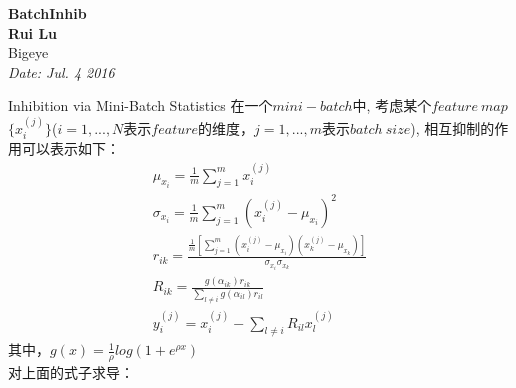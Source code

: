 \documentclass[oneside]{article}
\newcommand{\lecture}[5]{
   \newpage
   \noindent
   \begin{center}
        {\LARGE \bf #1} \\
        \vspace{0.5cm}
        {\bf #2} \\
        \vspace{0cm}
        #3\\
        \vspace{0.3cm}
        \it Date: #4
   \end{center}
}
\begin{document}
\graphicspath{{figures/}}
\lecture{BatchInhib}{Rui Lu}{Bigeye}{Jul. 4 2016}

\section{Inhibition via Mini-Batch Statistics}
在一个$mini-batch$中, 考虑某个$feature\ map$ $\{x_{i}^{(j)}\}$($i = 1, ..., N$表示$feature$的维度，$j = 1, ..., m$表示$batch\ size$), 相互抑制的作用可以表示如下：
\begin{eqnarray}
\mu_{x_{i}} = \frac{1}{m}\sum_{j=1}^{m}x_{i}^{(j)} \\
\sigma_{x_{i}} = \frac{1}{m}\sum_{j=1}^{m}(x_{i}^{(j)} - \mu_{x_{i}})^{2} \\
r_{ik} = \frac{\frac{1}{m}[\sum_{j=1}^{m}(x_{i}^{(j)} - \mu_{x_{i}})(x_{k}^{(j)} - \mu_{x_{k}})]}{\sigma_{x_{i}}\sigma_{x_{k}}} \\
R_{ik} = \frac{g(\alpha_{ik})r_{ik}}{\sum_{l\neq i}g(\alpha_{il})r_{il}} \\
y_{i}^{(j)} = x_{i}^{(j)} - \sum_{l\neq i}R_{il}x_{l}^{(j)}
\end{eqnarray}
其中，$g(x) = \frac{1}{\rho}log(1 + e^{\rho x})$\\
对上面的式子求导：
\end{document}
